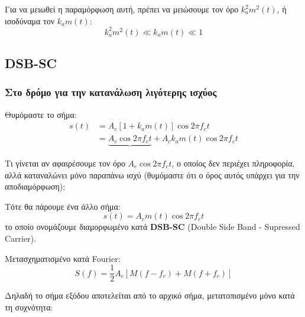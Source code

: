 \documentclass[11pt,a4paper,notitlepage,fleqn]{article}
\begin{document}
Για να μειωθεί η παραμόρφωση αυτή, πρέπει να μειώσουμε τον όρο \( k_a^2m^2(t) \), ή ισοδύναμα
τον \( k_a m(t) \):
\[
k_a^2m^2(t) \ll k_am(t) \ll 1
\]

\subsection{DSB-SC}
\label{dsb-sc}
\subsubsection{Στο δρόμο για την κατανάλωση λιγότερης ισχύος}
Θυμόμαστε το σήμα:
\begin{align*}
	s(t) &=
	A_c\left[1+k_a m(t)\right]\cos 2πf_c t
	\\
	&= \underbrace{A_c \cos 2π f_c t} + A_c k_a m(t) \cos 2π f_c t
\end{align*}

Τι γίνεται αν αφαιρέσουμε τον όρο \( A_c \cos 2πf_c t \), ο οποίος
δεν περιέχει πληροφορία, αλλά καταναλώνει μόνο παραπάνω ισχύ (θυμόμαστε
ότι ο όρος αυτός υπάρχει για την αποδιαμόρφωση);

Τότε θα πάρουμε ένα άλλο σήμα:
\[
\boxed{s(t) = A_c m(t) \cos 2π f_c t}
\]
το οποίο ονομάζουμε διαμορφωμένο κατά \textbf{DSB-SC} (Double Side Band - Supressed Carrier).

Μετασχηματισμένο κατά Fourier:
\[
S(f) =
\frac{1}{2} A_c \left[
M(f-f_c) + M(f+f_c)
\right]
\]

Δηλαδή το σήμα εξόδου αποτελείται από το αρχικό σήμα, μετατοπισμένο
μόνο κατά τη συχνότητα:

\begin{center}
\end{center}
\end{document}
